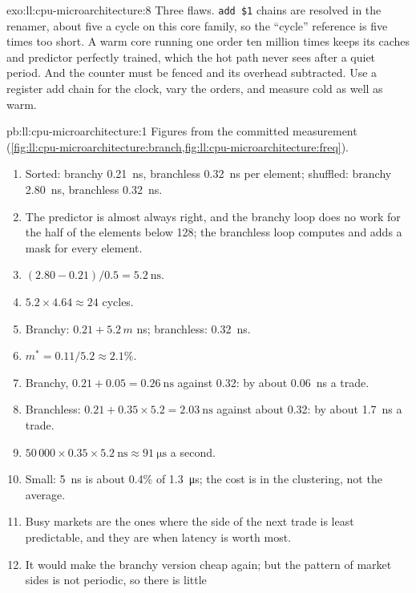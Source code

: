 \begin{solution}{exo:ll:cpu-microarchitecture:8}
Three flaws. \texttt{add \$1} chains are resolved in the renamer, about five a cycle on this core family, so the
``cycle'' reference is five times too short. A warm core running one order ten million times keeps its caches and
predictor perfectly trained, which the hot path never sees after a quiet period. And the counter must be fenced and
its overhead subtracted. Use a register add chain for the clock, vary the orders, and measure cold as well as warm.
\end{solution}

\begin{solution}{pb:ll:cpu-microarchitecture:1}
Figures from the committed measurement (\cref{fig:ll:cpu-microarchitecture:branch,fig:ll:cpu-microarchitecture:freq}).
\begin{enumerate}
\item Sorted: branchy \qty{0.21}{\nano\second}, branchless \qty{0.32}{\nano\second} per element; shuffled: branchy
\qty{2.80}{\nano\second}, branchless \qty{0.32}{\nano\second}.
\item The predictor is almost always right, and the branchy loop does no work for the half of the elements below 128;
the branchless loop computes and adds a mask for every element.
\item $(2.80 - 0.21)/0.5 = \qty{5.2}{\nano\second}$.
\item $5.2 \times 4.64 \approx 24$ cycles.
\item Branchy: $0.21 + 5.2\,m$ ns; branchless: \qty{0.32}{\nano\second}.
\item $m^\ast = 0.11/5.2 \approx 2.1\%$.
\item Branchy, $0.21 + 0.05 = \qty{0.26}{\nano\second}$ against 0.32: by about \qty{0.06}{\nano\second} a trade.
\item Branchless: $0.21 + 0.35 \times 5.2 = \qty{2.03}{\nano\second}$ against about 0.32: by about
\qty{1.7}{\nano\second} a trade.
\item $50\,000 \times 0.35 \times \qty{5.2}{\nano\second} \approx \qty{91}{\micro\second}$ a second.
\item Small: \qty{5}{\nano\second} is about 0.4\% of \qty{1.3}{\micro\second}; the cost is in the clustering,
not the average.
\item Busy markets are the ones where the side of the next trade is least predictable, and they are when latency is
worth most.
\item It would make the branchy version cheap again; but the pattern of market sides is not periodic, so there is little

\end{enumerate}
\end{solution}
